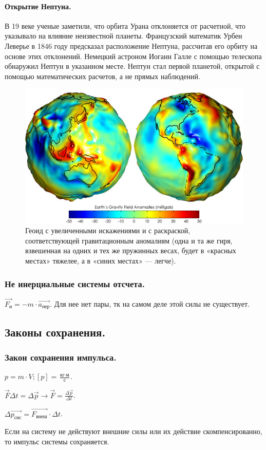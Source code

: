 \documentclass[12pt]{article}
\begin{document}
	\paragraph{Открытие Нептуна.} В 19 веке ученые заметили, что орбита Урана отклоняется от расчетной, что указывало на влияние неизвестной планеты. Французский математик Урбен Леверье в 1846 году предсказал расположение Нептуна, рассчитав его орбиту на основе этих отклонений. Немецкий астроном Иоганн Галле с помощью телескопа обнаружил Нептун в указанном месте. Нептун стал первой планетой, открытой с помощью математических расчетов, а не прямых наблюдений.
	\begin{figure}[H]
		\includegraphics[height=0.25\textwidth]{extra-materials/Геоид}
		\caption{Геоид с увеличенными искажениями и с раскраской, соответствующей гравитационным аномалиям (одна и та же гиря, взвешенная на одних и тех же пружинных весах, будет в «красных местах» тяжелее, а в «синих местах» — легче).}
	\end{figure}
	\subsubsection{Не инерциальные системы отсчета.}
	\begin{definition}
		$\vec{F_{\text{и}}} = -m \cdot \vec{a_{\text{пер}}}$. Для нее нет пары, тк на самом деле этой силы не существует.
	\end{definition}
	\subsection{Законы сохранения.}
	\subsubsection{Закон сохранения импульса.}
	\begin{definition}[Импульс]
		$p = m \cdot V; [p] = \frac{\text{кг} \cdot \text{м}}{\text{с}}$.
	\end{definition}
	\begin{definition}
		$\vec{F} \varDelta t = \varDelta \vec{p} \rightarrow \vec{F} = \frac{\varDelta \vec{p}}{\varDelta t}$.
	\end{definition}
	\begin{definition}
		$\varDelta \vec{p_{\text{сис}}} = \vec{F_{\text{внеш}}} \cdot \varDelta t$.
	\end{definition}
	\begin{definition}
		Если на систему не действуют внешние силы или их действие скомпенсированно, то импульс системы сохраняется.
	\end{definition}
\end{document}
